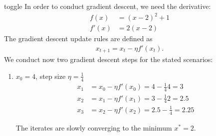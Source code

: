 \documentclass[letterpaper,10pt,english]{jupyterBook}
\begin{document}
\begin{enumerate}
\begin{sphinxuseclass}{toggle}
\sphinxAtStartPar
In order to conduct gradient descent, we need the derivative:
\begin{align*}
f(x) &= (x-2)^2 +1\\
f'(x)&= 2(x-2)
\end{align*}
\sphinxAtStartPar
The gradient descent update rules are defined as
\begin{equation*}
\begin{split}x_{t+1}=x_t-\eta f'(x_t).\end{split}
\end{equation*}
We conduct now two gradient descent steps for the stated scenarios:
\begin{enumerate}
%
\item {} 
\sphinxAtStartPar
\(x_0=4\), step size \(\eta=\frac14\)
\begin{align*}
    x_1 &= x_0 -\eta f'(x_0) = 4 - \frac14 4 = 3\\
    x_2 & = x_1 -\eta f'(x_1)= 3 -\frac14 2 = 2.5\\
    x_3 & = x_2 -\eta f'(x_2)= 2.5 -\frac14 = 2.25
    \end{align*}\begin{center}\pgfplotsset{compat=newest}
\end{center}
\sphinxAtStartPar
The iterates are slowly converging to the minimum \(x^*=2\).


\end{enumerate}
\end{sphinxuseclass}
\end{enumerate}
\end{document}
